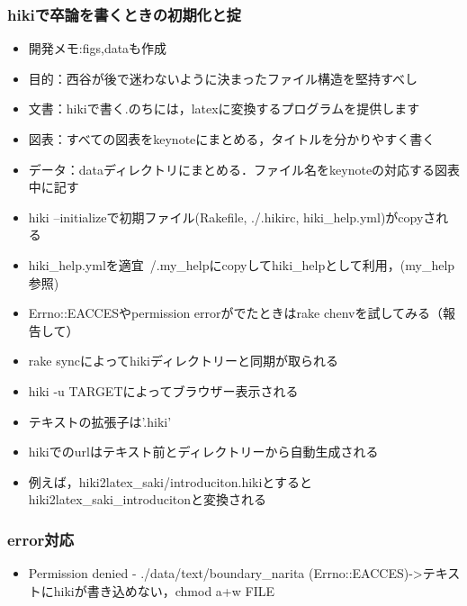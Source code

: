 \subsubsection{hikiで卒論を書くときの初期化と掟}\begin{itemize}
\item 開発メモ:figs,dataも作成
\item 目的：西谷が後で迷わないように決まったファイル構造を堅持すべし
\item 文書：hikiで書く.のちには，latexに変換するプログラムを提供します
\item 図表：すべての図表をkeynoteにまとめる，タイトルを分かりやすく書く
\item データ：dataディレクトリにまとめる．ファイル名をkeynoteの対応する図表中に記す
\item hiki --initializeで初期ファイル(Rakefile, ./.hikirc, hiki\_help.yml)がcopyされる
\item hiki\_help.ymlを適宜~/.my\_helpにcopyしてhiki\_helpとして利用，(my\_help参照)
\item Errno::EACCESやpermission errorがでたときはrake chenvを試してみる（報告して）
\item rake syncによってhikiディレクトリーと同期が取られる
\item hiki -u TARGETによってブラウザー表示される
\item テキストの拡張子は'.hiki'
\item hikiでのurlはテキスト前とディレクトリーから自動生成される
\item 例えば，hiki2latex\_saki/introduciton.hikiとするとhiki2latex\_saki\_introducitonと変換される
\end{itemize}
\subsubsection{error対応}\begin{itemize}
\item Permission denied - ./data/text/boundary\_narita (Errno::EACCES)->テキストにhikiが書き込めない，chmod a+w FILE
\end{itemize}
